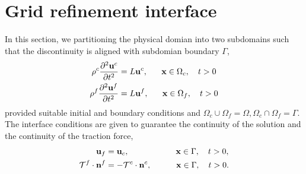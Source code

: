 \documentclass[a4paper]{article}
\begin{document}
\section{Grid refinement interface}
In this section, we partitioning the physical domian into two subdomains such that the discontinuity is aligned with subdomian boundary $\Gamma$,
\begin{align}\label{fine_coarse_problem}
\rho^c\frac{\partial ^2 {\bf u}^c}{\partial t^2} &= L{\bf u}^c, \ \ \ \ \ {\bf x} \in \Omega_c,\ \ \ t>0 \nonumber\\
\rho^f\frac{\partial ^2 {\bf u}^f}{\partial t^2} &= L{\bf u}^f, \ \ \ \ \ {\bf x} \in \Omega_f,\ \ \ t>0
\end{align}
provided suitable initial and boundary conditions and $\Omega_c\cup\Omega_f = \Omega, \Omega_c\cap\Omega_f = \Gamma$. The interface conditions are given to guarantee the continuity of the solution and the continuity of the traction force,
\begin{align*}
{\bf u}_f &= {\bf u}_c, \ \ \ \ \ \ \ \ \ \ \ \ \ \ \ \ \ {\bf x}\in \Gamma, \ \ \ t>0, \\
\mathcal{T}^f\cdot{\bf n}^f &= -\mathcal{T}^c\cdot{\bf n}^c,  \ \ \ \ \ \ \ \ \ {\bf x}\in \Gamma, \ \ \ t>0.
\end{align*}
\end{document}
